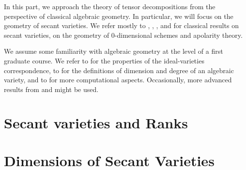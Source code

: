In this part, we approach the theory of tensor decompositions from the perspective of classical algebraic geometry. In particular, we will focus on the geometry of secant varieties. We refer mostly to \cite{Zak93}, \cite{IK99}, \cite{CGO14}, \cite{Rus16} and \cite{BCCGO18} for classical results on secant varieties, on the geometry of $0$-dimensional schemes and apolarity theory. 

We assume some familiarity with algebraic geometry at the level of a first graduate course. We refer to \cite{Sha94} for the properties of the ideal-varieties correspondence, to \cite{Har92} for the definitions of dimension and degree of an algebraic variety, and to \cite{CLO07} for more computational aspects. Occasionally, more advanced results from \cite{Mum76} and \cite{Vak24} might be used. 

\chapter{Secant varieties and Ranks}
\label{geometrySecants-chapter-BasicDefinitions}


\chapter{Dimensions of Secant Varieties}
\label{geometrySecants-chapter-DimensionsSecants}


